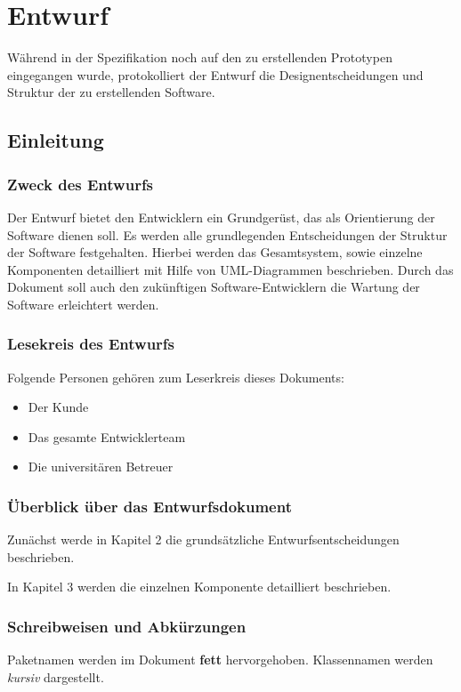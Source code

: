 
\chapter{Entwurf}
\label{chap:entwurf}

Während in der Spezifikation noch auf den zu erstellenden Prototypen eingegangen wurde, protokolliert der Entwurf die Designentscheidungen und Struktur der zu erstellenden Software.

\section{Einleitung}

\subsection{Zweck des Entwurfs}
Der Entwurf bietet den Entwicklern ein Grundgerüst, das als Orientierung der Software dienen soll.
Es werden alle grundlegenden Entscheidungen \bzgl der Struktur der Software festgehalten.
Hierbei werden das Gesamtsystem, sowie einzelne Komponenten detailliert mit Hilfe von UML-Diagrammen beschrieben.
Durch das Dokument soll auch den zukünftigen Software-Entwicklern die Wartung der Software erleichtert werden.

\subsection{Lesekreis des Entwurfs}
Folgende Personen gehören zum Leserkreis dieses Dokuments:
\begin{itemize}
	\item Der Kunde
	\item Das gesamte Entwicklerteam
	\item Die universitären Betreuer
\end{itemize}

\subsection{Überblick über das Entwurfsdokument}
Zunächst werde in Kapitel 2 die grundsätzliche Entwurfsentscheidungen beschrieben.

In Kapitel 3 werden die einzelnen Komponente detailliert beschrieben.

\subsection{Schreibweisen und Abkürzungen}
Paketnamen werden im Dokument \textbf{fett} hervorgehoben. Klassennamen werden \textit{kursiv} dargestellt.

